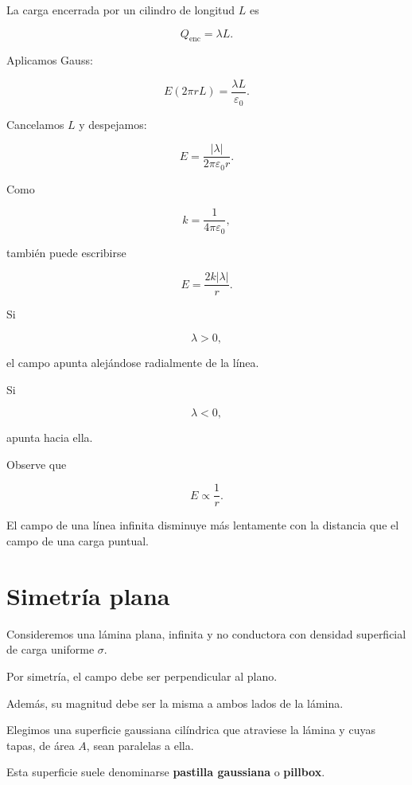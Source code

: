 La carga encerrada por un cilindro de longitud \(L\) es

\[
Q_{\text{enc}}=\lambda L.
\]

Aplicamos Gauss:

\[
E(2\pi rL)=\frac{\lambda L}{\varepsilon_0}.
\]

Cancelamos \(L\) y despejamos:

\begin{equation}
\boxed{
E=\frac{|\lambda|}{2\pi\varepsilon_0r}
}.
\label{eq:campo_linea_infinita}
\end{equation}

Como

\[
k=\frac{1}{4\pi\varepsilon_0},
\]

también puede escribirse

\[
\boxed{
E=\frac{2k|\lambda|}{r}
}.
\]

Si

\[
\lambda>0,
\]

el campo apunta alejándose radialmente de la línea.

Si

\[
\lambda<0,
\]

apunta hacia ella.

Observe que

\[
\boxed{E\propto\frac{1}{r}}.
\]

El campo de una línea infinita disminuye más lentamente con la distancia que el campo
de una carga puntual.


\section{Simetría plana}

Consideremos una lámina plana, infinita y no conductora con densidad superficial de
carga uniforme \(\sigma\).

Por simetría, el campo debe ser perpendicular al plano.

Además, su magnitud debe ser la misma a ambos lados de la lámina.

Elegimos una superficie gaussiana cilíndrica que atraviese la lámina y cuyas tapas,
de área \(A\), sean paralelas a ella.

Esta superficie suele denominarse \textbf{pastilla gaussiana} o \textbf{pillbox}.

\begin{center}
\end{center}

